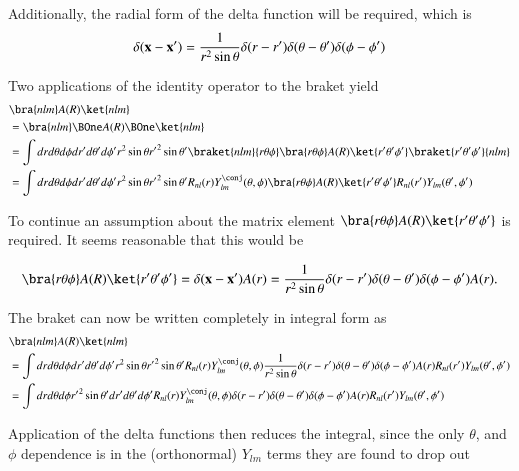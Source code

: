 Additionally, the radial form of the delta function will be required, which is
\begin{equation}\label{eqn:qmIproblemSet4:204}
\delta(\mathbf{x} - \mathbf{x}') = \frac{1}{r^2 \sin\theta} \delta(r - r') \delta(\theta - \theta') \delta(\phi - \phi')
\end{equation}

Two applications of the identity operator to the braket yield
\begin{align*}
&\bra{nlm} A(R) \ket{nlm} \\
&=\bra{nlm} \BOne A(R) \BOne \ket{nlm} \\
&=
\int 
dr d\theta d\phi 
dr' d\theta' d\phi'
r^2 \sin\theta 
{r'}^2 \sin\theta' 
\braket{nlm}{ r \theta \phi}
\bra{ r \theta \phi} A(R) 
\ket{ r' \theta' \phi'}
\braket{ r' \theta' \phi'}{nlm} \\
&=
\int 
dr d\theta d\phi 
dr' d\theta' d\phi'
r^2 \sin\theta 
{r'}^2 \sin\theta' 
R_{nl}(r) Y_{lm}^\conj(\theta, \phi)
\bra{ r \theta \phi} A(R) \ket{ r' \theta' \phi'}
R_{nl}(r') Y_{lm}(\theta', \phi') \\
\end{align*}

To continue an assumption about the matrix element $\bra{ r \theta \phi} A(R) \ket{ r' \theta' \phi'}$ is required.  It seems reasonable that this would be

\begin{equation}\label{eqn:qmIproblemSet4:206}
\bra{ r \theta \phi} A(R) \ket{ r' \theta' \phi'} = \\
\delta(\Bx - \Bx') A(r) = \inv{r^2 \sin\theta} \delta(r-r') \delta(\theta -\theta')\delta(\phi-\phi') A(r).
\end{equation}

The braket can now be written completely in integral form as
\begin{align*}
&\bra{nlm} A(R) \ket{nlm} \\
&=
\int 
dr d\theta d\phi 
dr' d\theta' d\phi'
r^2 \sin\theta 
{r'}^2 \sin\theta' 
R_{nl}(r) Y_{lm}^\conj(\theta, \phi)
\inv{r^2 \sin\theta} \delta(r-r') \delta(\theta -\theta')\delta(\phi-\phi') A(r)
R_{nl}(r') Y_{lm}(\theta', \phi') \\
&=
\int 
dr d\theta d\phi 
{r'}^2 \sin\theta' dr' d\theta' d\phi'
R_{nl}(r) Y_{lm}^\conj(\theta, \phi)
\delta(r-r') \delta(\theta -\theta')\delta(\phi-\phi') A(r)
R_{nl}(r') Y_{lm}(\theta', \phi') \\
\end{align*}

Application of the delta functions then reduces the integral, since the only $\theta$, and $\phi$ dependence is in the (orthonormal) $Y_{lm}$ terms they are found to drop out

